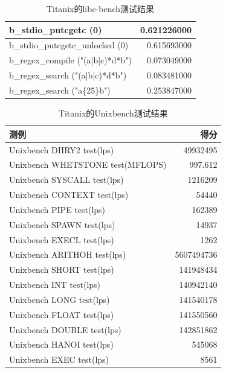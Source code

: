 \begin{table}[H]
\begin{tabular}{|l|r|}
        \hline
        b\_stdio\_putcgetc (0) & 0.621226000 \\
        \hline
        b\_stdio\_putcgetc\_unlocked (0) & 0.615693000 \\
        \hline
        b\_regex\_compile ("(a|b|c)*d*b") & 0.073049000 \\
        \hline
        b\_regex\_search ("(a|b|c)*d*b") & 0.083481000 \\
        \hline
        b\_regex\_search ("a\{25\}b") & 0.253847000 \\
        \hline
    \end{tabular}
    \caption{Titanix的libc-bench测试结果}
\end{table}

\begin{table}[H]
    \centering
    \begin{tabular}{|l|r|}
        \hline
        测例 & 得分 \\
        \hline
        Unixbench DHRY2 test(lps) & 49932495 \\
        \hline
        Unixbench WHETSTONE test(MFLOPS) & 997.612 \\
        \hline
        Unixbench SYSCALL test(lps) & 1216209 \\
        \hline
        Unixbench CONTEXT test(lps) & 54440 \\
        \hline
        Unixbench PIPE test(lps) & 162389 \\
        \hline
        Unixbench SPAWN test(lps) & 14937 \\
        \hline
        Unixbench EXECL test(lps) & 1262 \\
        \hline
        Unixbench ARITHOH test(lps) & 5607494736 \\
        \hline
        Unixbench SHORT test(lps) & 141948434 \\
        \hline
        Unixbench INT test(lps) & 140942140 \\
        \hline
        Unixbench LONG test(lps) & 141540178 \\
        \hline
        Unixbench FLOAT test(lps) & 141550560 \\
        \hline
        Unixbench DOUBLE test(lps) & 142851862 \\
        \hline
        Unixbench HANOI test(lps) & 545068 \\
        \hline
        Unixbench EXEC test(lps) & 8561 \\
        \hline
    \end{tabular}
    \caption{Titanix的Unixbench测试结果}
    
\end{table}

